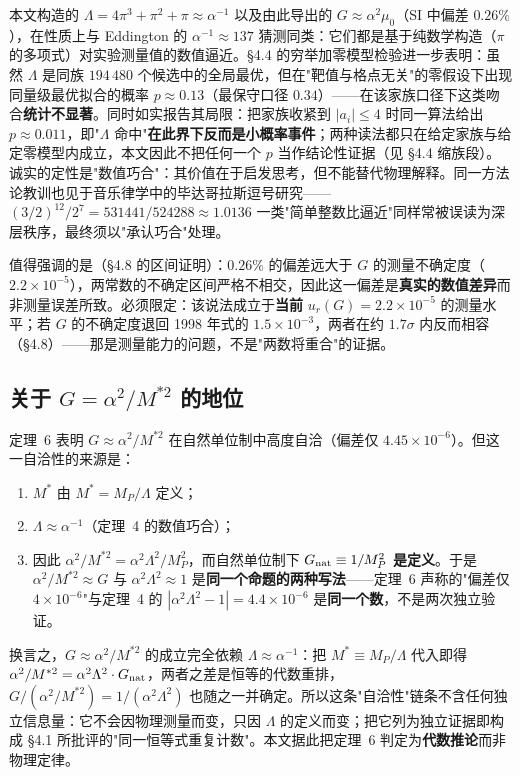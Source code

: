 \documentclass[12pt,a4paper]{article}
\begin{document}
本文构造的 $\Lambda = 4\pi^3+\pi^2+\pi \approx \alpha^{-1}$ 以及由此导出的 $G \approx \alpha^2\mu_0$（SI 中偏差 $0.26\%$），在性质上与 Eddington 的 $\alpha^{-1} \approx 137$ 猜测同类：它们都是基于纯数学构造（$\pi$ 的多项式）对实验测量值的数值逼近。§4.4 的穷举加零模型检验进一步表明：虽然 $\Lambda$ 是同族 $194\,480$ 个候选中的全局最优，但在"靶值与格点无关"的零假设下出现同量级最优拟合的概率 $p \approx 0.13$（最保守口径 $0.34$）——在该家族口径下这类吻合\textbf{统计不显著}。同时如实报告其局限：把家族收紧到 $\lvert a_i\rvert\le 4$ 时同一算法给出 $p\approx 0.011$，即"$\Lambda$ 命中"\textbf{在此界下反而是小概率事件}；两种读法都只在给定家族与给定零模型内成立，本文因此不把任何一个 $p$ 当作结论性证据（见 §4.4 缩族段）。诚实的定性是"数值巧合"：其价值在于启发思考，但不能替代物理解释。同一方法论教训也见于音乐律学中的毕达哥拉斯逗号研究——$(3/2)^{12}/2^7 = 531441/524288 \approx 1.0136$ 一类"简单整数比逼近"同样常被误读为深层秩序，最终须以"承认巧合"处理。

值得强调的是（§4.8 的区间证明）：$0.26\%$ 的偏差远大于 $G$ 的测量不确定度（$2.2\times10^{-5}$），两常数的不确定区间严格不相交，因此这一偏差是\textbf{真实的数值差异}而非测量误差所致。必须限定：该说法成立于\textbf{当前} $u_r(G)=2.2\times10^{-5}$ 的测量水平；若 $G$ 的不确定度退回 1998 年式的 $1.5\times10^{-3}$，两者在约 $1.7\sigma$ 内反而相容（§4.8）——那是测量能力的问题，不是"两数将重合"的证据。

\subsection{关于 $G = \alpha^2/M^{*2}$ 的地位}

定理~6 表明 $G \approx \alpha^2/M^{*2}$ 在自然单位制中高度自洽（偏差仅 $4.45\times10^{-6}$）。但这一自洽性的来源是：

\begin{enumerate}
  \item $M^*$ 由 $M^* = M_P/\Lambda$ 定义；
  \item $\Lambda \approx \alpha^{-1}$（定理~4 的数值巧合）；
  \item 因此 $\alpha^2/M^{*2} = \alpha^2\Lambda^2/M_P^2$，而自然单位制下 $G_{\rm nat} \equiv 1/M_P^2$ \textbf{是定义}。于是 $\alpha^2/M^{*2} \approx G$ 与 $\alpha^2\Lambda^2 \approx 1$ 是\textbf{同一个命题的两种写法}——定理~6 声称的"偏差仅 $4\times10^{-6}$"与定理~4 的 $|\alpha^2\Lambda^2 - 1| = 4.4\times10^{-6}$ 是\textbf{同一个数}，不是两次独立验证。
\end{enumerate}

换言之，$G \approx \alpha^2/M^{*2}$ 的成立完全依赖 $\Lambda \approx \alpha^{-1}$：把 $M^* \equiv M_P/\Lambda$ 代入即得$\alpha^2/M^{*2} = \alpha^2\Lambda^2 \cdot G_{\rm nat}$，两者之差是恒等的代数重排，$G/(\alpha^2/M^{*2}) = 1/(\alpha^2\Lambda^2)$ 也随之一并确定。所以这条"自洽性"链条不含任何独立信息量：它不会因物理测量而变，只因 $\Lambda$ 的定义而变；把它列为独立证据即构成 §4.1 所批评的"同一恒等式重复计数"。本文据此把定理~6 判定为\textbf{代数推论}而非物理定律。
\end{document}
